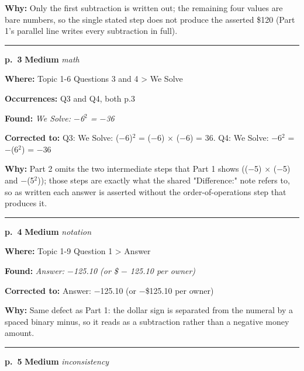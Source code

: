 \documentclass[11pt]{article}
\newcommand{\sevmed}[1]{\textcolor{orange!80!black}{\textbf{#1}}}
\begin{document}
\noindent\textbf{Why: }Only the first subtraction is written out; the remaining four values are bare numbers, so the single stated step does not produce the asserted \$120 (Part 1's parallel line writes every subtraction in full).\par\vspace{4pt}
\noindent\rule{\textwidth}{0.4pt}\par\nobreak\vspace{2pt}
\noindent\textbf{p.~3} \quad \sevmed{Medium} \quad \textit{math}\par
\noindent\textbf{Where: }Topic 1-6 Questions 3 and 4 > We Solve\par
\noindent\textbf{Occurrences: }Q3 and Q4, both p.3\par
\noindent\textbf{Found: }\textit{We Solve: $-$6$^2$ = $-$36}\par
\noindent\textbf{Corrected to: }Q3: We Solve: ($-$6)$^2$ = ($-$6) $\times$ ($-$6) = 36. Q4: We Solve: $-$6$^2$ = $-$(6$^2$) = $-$36\par
\noindent\textbf{Why: }Part 2 omits the two intermediate steps that Part 1 shows (($-$5) $\times$ ($-$5) and $-$(5$^2$)); those steps are exactly what the shared "Difference:" note refers to, so as written each answer is asserted without the order-of-operations step that produces it.\par\vspace{4pt}
\noindent\rule{\textwidth}{0.4pt}\par\nobreak\vspace{2pt}
\noindent\textbf{p.~4} \quad \sevmed{Medium} \quad \textit{notation}\par
\noindent\textbf{Where: }Topic 1-9 Question 1 > Answer\par
\noindent\textbf{Found: }\textit{Answer: $-$125.10 (or \$ $-$ 125.10 per owner)}\par
\noindent\textbf{Corrected to: }Answer: $-$125.10 (or $-$\$125.10 per owner)\par
\noindent\textbf{Why: }Same defect as Part 1: the dollar sign is separated from the numeral by a spaced binary minus, so it reads as a subtraction rather than a negative money amount.\par\vspace{4pt}
\noindent\rule{\textwidth}{0.4pt}\par\nobreak\vspace{2pt}
\noindent\textbf{p.~5} \quad \sevmed{Medium} \quad \textit{inconsistency}\par
\end{document}
